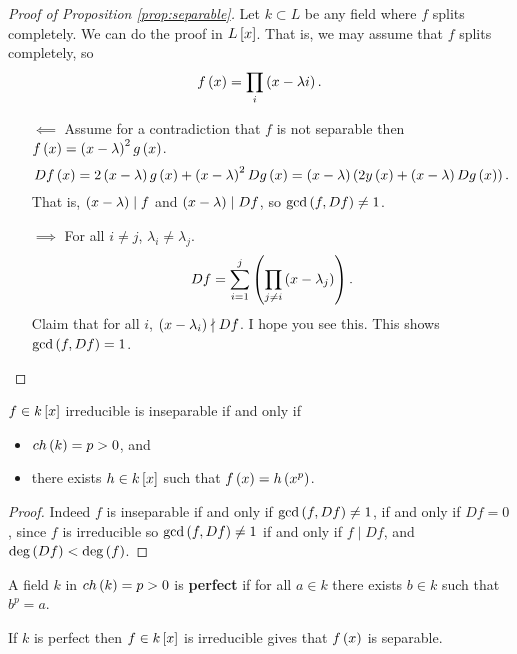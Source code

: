 \begin{proof}[Proof of Proposition \ref{prop:separable}]
Let $ k \subset L $ be any field where $ f $ splits completely. We can do the proof in $ L\sb{x} $. That is, we may assume that $ f $ splits completely, so
$$ f\rb{x} = \prod_i \rb{x - \lambda i}. $$
\begin{itemize}
\item[$ \impliedby $] Assume for a contradiction that $ f $ is not separable then $ f\rb{x} = \rb{x - \lambda}^2g\rb{x} $.
$$ Df\rb{x} = 2\rb{x - \lambda}g\rb{x} + \rb{x - \lambda}^2Dg\rb{x} = \rb{x - \lambda}\rb{2y\rb{x} + \rb{x - \lambda}Dg\rb{x}}. $$
That is, $ \rb{x - \lambda} \mid f $ and $ \rb{x - \lambda} \mid Df $, so $ \gcd\rb{f, Df} \ne 1 $.
\item[$ \implies $] For all $ i \ne j $, $ \lambda_i \ne \lambda_j $.
$$ Df = \sum_{i = 1}^j \rb{\prod_{j \ne i} \rb{x - \lambda_j}}. $$
Claim that for all $ i $, $ \rb{x - \lambda_i} \nmid Df $. I hope you see this. This shows $ \gcd\rb{f, Df} = 1 $.
\end{itemize}
\end{proof}

\pagebreak

\begin{theorem}
$ f \in k\sb{x} $ irreducible is inseparable if and only if
\begin{itemize}
\item $ ch\rb{k} = p > 0 $, and
\item there exists $ h \in k\sb{x} $ such that $ f\rb{x} = h\rb{x^p} $.
\end{itemize}
\end{theorem}

\begin{proof}
Indeed $ f $ is inseparable if and only if $ \gcd\rb{f, Df} \ne 1 $, if and only if $ Df = 0 $, since $ f $ is irreducible so $ \gcd\rb{f, Df} \ne 1 $ if and only if $ f \mid Df $, and $ \deg\rb{Df} < \deg\rb{f} $.
\end{proof}

\begin{definition}
A field $ k $ in $ ch\rb{k} = p > 0 $ is \textbf{perfect} if for all $ a \in k $ there exists $ b \in k $ such that $ b^p = a $.
\end{definition}

\begin{proposition}
If $ k $ is perfect then $ f \in k\sb{x} $ is irreducible gives that $ f\rb{x} $ is separable.
\end{proposition}

